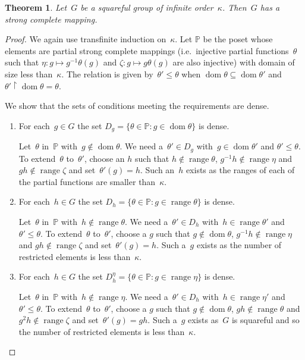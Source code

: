 \documentclass[12pt,a4paper]{article}
\newtheorem{thm}{Theorem}[section]
\DeclareMathOperator{\dom}{dom}
\DeclareMathOperator{\ran}{range}
\newcommand{\rest}{\mathbin{\upharpoonright}}
\renewcommand{\P}{\mathbb{P}}
\begin{document}

\begin{thm}
Let~$G$ be a squareful group of infinite order~$\kappa$.  Then~$G$ has a strong complete mapping.
\end{thm}

\begin{proof}
We again use transfinite induction on~$\kappa$.   Let $\P$ be the poset whose elements are partial strong complete mappings (i.e.~injective partial functions~$\theta$ such that $\eta: g \mapsto g^{-1}\theta(g)$ and $\zeta: g \mapsto g\theta(g)$ are also injective) with domain of size less than~$\kappa$.  The relation is given by~$\theta' \leq \theta$ when $\dom \theta \subseteq \dom \theta'$ and $\theta' \rest \dom \theta = \theta$.

We show that the sets of conditions meeting the requirements are dense.

\begin{enumerate}

\item For each~$g \in G$ the set  $D_g = \{ \theta \in \P : g \in \dom \theta \}$ is dense.

Let~$\theta$ in~$\P$ with~$g \not\in \dom \theta$.  We need a~$\theta' \in D_g$ with~$g \in \dom \theta'$ and $\theta' \leq \theta$.  To extend~$\theta$ to~$\theta'$, choose an $h$ such that $h \not\in \ran \theta$, $g^{-1}h \not\in \ran \eta$ and $gh \not\in \ran \zeta$ and set~$\theta'(g) = h$.  Such an~$h$ exists as the ranges of each of the partial functions are smaller than~$\kappa$.


\item For each~$h \in G$ the set  $D_h = \{ \theta \in \P : g \in \ran \theta \}$ is dense.

Let~$\theta$ in~$\P$ with~$h \not\in \ran \theta$.  We need a~$\theta' \in D_h$ with~$h \in \ran \theta'$ and $\theta' \leq \theta$.
To extend~$\theta$ to~$\theta'$,  choose a $g$ such that $g \not\in \dom \theta$, $g^{-1}h \not\in \ran \eta$ and $gh \not\in \ran \zeta$ and set~$\theta'(g) = h$.  Such a~$g$ exists as the number of restricted elements is less than~$\kappa$.


\item For each~$h \in G$ the set  $D_h^{\eta} = \{ \theta \in \P : g \in \ran \eta \}$ is dense.

Let~$\theta$ in~$\P$ with~$h \not\in \ran \eta$.  We need a~$\theta' \in D_h$ with~$h \in \ran \eta'$ and $\theta' \leq \theta$.
To extend~$\theta$ to~$\theta'$,  choose a $g$ such that $g \not\in \dom \theta$, $gh \not\in \ran \theta$ and $g^2h \not\in \ran \zeta$ and set~$\theta'(g) = gh$.  Such a~$g$ exists as~$G$ is squareful and so the number of restricted elements is less than~$\kappa$.



\end{enumerate}
\end{proof}
\end{document}
